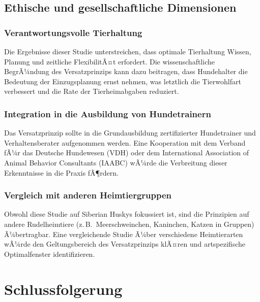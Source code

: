 ﻿\documentclass[12pt, a4paper]{article}
\theoremstyle{plain}
\theoremstyle{definition}
\theoremstyle{remark}
\begin{document}
\subsection{Ethische und gesellschaftliche Dimensionen}

\subsubsection{Verantwortungsvolle Tierhaltung}

Die Ergebnisse dieser Studie unterstreichen, dass optimale Tierhaltung
Wissen, Planung und zeitliche FlexibilitÃ¤t erfordert. Die wissenschaftliche
BegrÃ¼ndung des Versatzprinzips kann dazu beitragen, dass Hundehalter die
Bedeutung der Einzugsplanung ernst nehmen, was letztlich die Tierwohlfart
verbessert und die Rate der Tierheimabgaben reduziert.

\subsubsection{Integration in die Ausbildung von Hundetrainern}

Das Versatzprinzip sollte in die Grundausbildung zertifizierter
Hundetrainer und Verhaltensberater aufgenommen werden. Eine Kooperation
mit dem Verband fÃ¼r das Deutsche Hundewesen (VDH) oder dem
International Association of Animal Behavior Consultants (IAABC)
wÃ¼rde die Verbreitung dieser Erkenntnisse in die Praxis fÃ¶rdern.

\subsubsection{Vergleich mit anderen Heimtiergruppen}

Obwohl diese Studie auf Siberian Huskys fokussiert ist, sind die
Prinzipien auf andere Rudelheimtiere (z.\,B.\ Meerschweinchen, Kaninchen,
Katzen in Gruppen) Ã¼bertragbar. Eine vergleichende Studie Ã¼ber verschiedene
Heimtierarten wÃ¼rde den Geltungsbereich des Versatzprinzips klÃ¤ren und
artspezifische Optimalfenster identifizieren.

\section{Schlussfolgerung}
\label{sec:schlussfolgerung}
\end{document}
